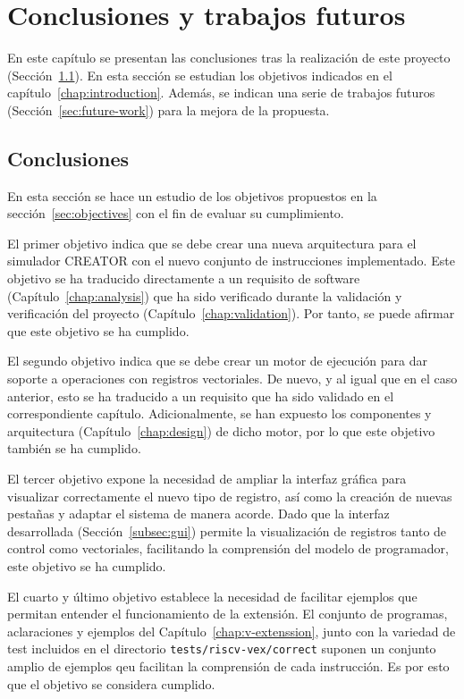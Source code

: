 \chapter{Conclusiones y trabajos futuros}\label{chap:conclusions}
En este capítulo se presentan las conclusiones tras la realización de este proyecto (Sección~\ref{sec:conclussions}). En esta sección se estudian los objetivos indicados en el capítulo~\ref{chap:introduction}. Además, se indican una serie de trabajos futuros (Sección~\ref{sec:future-work}) para la mejora de la propuesta.

\section{Conclusiones}\label{sec:conclussions}
En esta sección se hace un estudio de los objetivos propuestos en la sección~\ref{sec:objectives} con el fin de evaluar su cumplimiento.

El primer objetivo indica que se debe crear una nueva arquitectura para el simulador CREATOR con el nuevo conjunto de instrucciones implementado. Este objetivo se ha traducido directamente a un requisito de software (Capítulo~\ref{chap:analysis}) que ha sido verificado durante la validación y verificación del proyecto (Capítulo~\ref{chap:validation}). Por tanto, se puede afirmar que este objetivo se ha cumplido.

El segundo objetivo indica que se debe crear un motor de ejecución para dar soporte a operaciones con registros vectoriales. De nuevo, y al igual que en el caso anterior, esto se ha traducido a un requisito que ha sido validado en el correspondiente capítulo. Adicionalmente, se han expuesto los componentes y arquitectura (Capítulo~\ref{chap:design}) de dicho motor, por lo que este objetivo también se ha cumplido.

El tercer objetivo expone la necesidad de ampliar la interfaz gráfica para visualizar correctamente el nuevo tipo de registro, así como la creación de nuevas pestañas y adaptar el sistema de manera acorde. Dado que la interfaz desarrollada (Sección~\ref{subsec:gui}) permite la visualización de registros tanto de control como vectoriales, facilitando la comprensión del modelo de programador, este objetivo se ha cumplido.

El cuarto y último objetivo establece la necesidad de facilitar ejemplos que permitan entender el funcionamiento de la extensión. El conjunto de programas, aclaraciones y ejemplos del Capítulo~\ref{chap:v-extenssion}, junto con la variedad de test incluidos en el directorio \texttt{tests/riscv-vex/correct} suponen un conjunto amplio de ejemplos qeu facilitan la comprensión de cada instrucción. Es por esto que el objetivo se considera cumplido.

